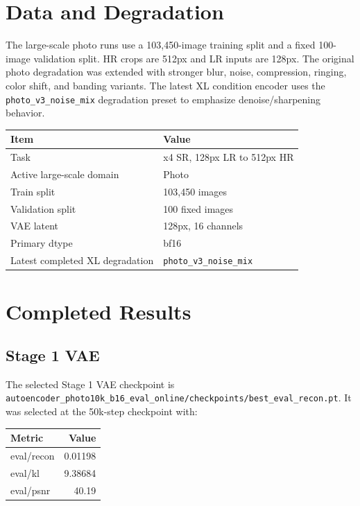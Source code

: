 \documentclass[10pt]{article}
\begin{document}
\section{Data and Degradation}

The large-scale photo runs use a 103,450-image training split and a fixed
100-image validation split. HR crops are 512px and LR inputs are 128px. The
original photo degradation was extended with stronger blur, noise, compression,
ringing, color shift, and banding variants. The latest XL condition encoder uses
the \texttt{photo\_v3\_noise\_mix} degradation preset to emphasize
denoise/sharpening behavior.

\begin{table}[H]
\centering
\begin{tabular}{ll}
\toprule
Item & Value \\
\midrule
Task & x4 SR, 128px LR to 512px HR \\
Active large-scale domain & Photo \\
Train split & 103,450 images \\
Validation split & 100 fixed images \\
VAE latent & 128px, 16 channels \\
Primary dtype & bf16 \\
Latest completed XL degradation & \texttt{photo\_v3\_noise\_mix} \\
\bottomrule
\end{tabular}
\end{table}

\section{Completed Results}

\subsection{Stage 1 VAE}

The selected Stage 1 VAE checkpoint is
\texttt{autoencoder\_photo10k\_b16\_eval\_online/checkpoints/best\_eval\_recon.pt}.
It was selected at the 50k-step checkpoint with:

\begin{table}[H]
\centering
\begin{tabular}{lr}
\toprule
Metric & Value \\
\midrule
eval/recon & 0.01198 \\
eval/kl & 9.38684 \\
eval/psnr & 40.19 \\
\bottomrule
\end{tabular}
\end{table}
\end{document}
